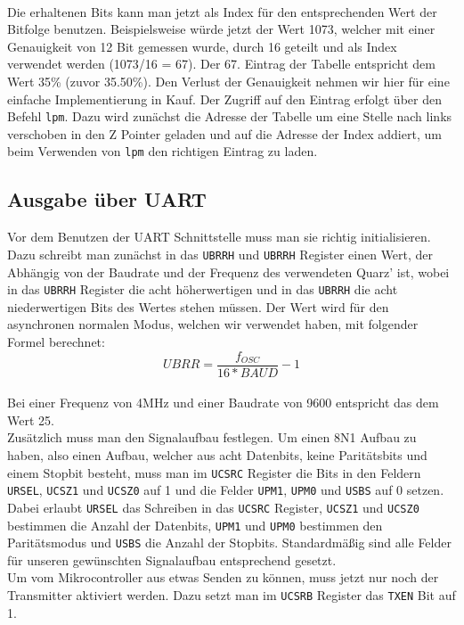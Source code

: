 \documentclass[]{article}
\begin{document}
\\
Die erhaltenen Bits kann man jetzt als Index für den entsprechenden Wert der Bitfolge benutzen. Beispielsweise würde jetzt der Wert 1073, welcher mit einer Genauigkeit von 12 Bit gemessen wurde, durch 16 geteilt und als Index verwendet werden (1073/16 = 67). Der 67. Eintrag der Tabelle entspricht dem Wert 35\% (zuvor 35.50\%). Den Verlust der Genauigkeit nehmen wir hier für eine einfache Implementierung in Kauf. Der Zugriff auf den Eintrag erfolgt über den Befehl \texttt{lpm}. Dazu wird zunächst die Adresse der Tabelle um eine Stelle nach links verschoben in den Z Pointer geladen und auf die Adresse der Index addiert, um beim Verwenden von \texttt{lpm} den richtigen Eintrag zu laden.

\subsection{Ausgabe über UART}
Vor dem Benutzen der UART Schnittstelle muss man sie richtig initialisieren. Dazu schreibt man zunächst in das \texttt{UBRRH} und \texttt{UBRRH} Register einen Wert, der Abhängig von der Baudrate und der Frequenz des verwendeten Quarz' ist, wobei in das \texttt{UBRRH} Register die acht höherwertigen und in das \texttt{UBRRH} die acht niederwertigen Bits des Wertes stehen müssen. Der Wert wird für den asynchronen normalen Modus, welchen wir verwendet haben, mit folgender Formel berechnet:
\begin{equation*}
UBRR = \frac{f_{OSC}}{16*BAUD} -1
\end{equation*}
\\Bei einer Frequenz von 4MHz und einer Baudrate von 9600 entspricht das dem Wert 25. \\Zusätzlich muss man den Signalaufbau festlegen. Um einen 8N1 Aufbau zu haben, also einen Aufbau, welcher aus acht Datenbits, keine Paritätsbits und einem Stopbit besteht, muss man im \texttt{UCSRC} Register die Bits in den Feldern \texttt{URSEL}, \texttt{UCSZ1} und \texttt{UCSZ0} auf 1 und die Felder \texttt{UPM1}, \texttt{UPM0} und \texttt{USBS} auf 0 setzen. Dabei erlaubt \texttt{URSEL} das Schreiben in das \texttt{UCSRC} Register, \texttt{UCSZ1} und \texttt{UCSZ0} bestimmen die Anzahl der Datenbits, \texttt{UPM1} und \texttt{UPM0} bestimmen den Paritätsmodus und \texttt{USBS} die Anzahl der Stopbits. Standardmäßig sind alle Felder für unseren gewünschten Signalaufbau entsprechend gesetzt. 
\\Um vom Mikrocontroller aus etwas Senden zu können, muss jetzt nur noch der Transmitter aktiviert werden. Dazu setzt man im \texttt{UCSRB} Register das \texttt{TXEN} Bit auf 1.
\end{document}
